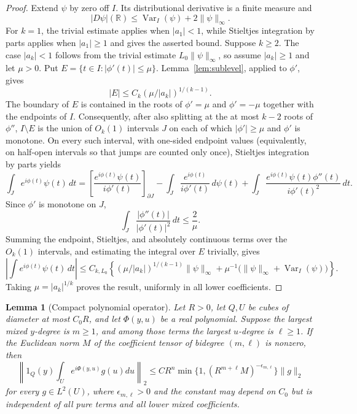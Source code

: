 \documentclass[11pt]{article}
\numberwithin{equation}{section}
\newtheorem{lemma}[theorem]{Lemma}
\theoremstyle{remark}
\theoremstyle{definition}
\newcommand{\Var}{\operatorname{Var}}
\newcommand{\norm}[1]{\lVert #1\rVert}
\begin{document}
\begin{proof}
Extend $\psi$ by zero off $I$.  Its distributional derivative is a finite
measure and
\[
 |D\psi|(\mathbb R)\le \Var_I(\psi)+2\norm\psi_\infty.
\]
For $k=1$, the trivial estimate applies when $|a_1|<1$, while Stieltjes
integration by parts applies when $|a_1|\ge1$ and gives the asserted bound.
Suppose $k\ge2$.  The case $|a_k|<1$ follows from the trivial estimate
$L_0\norm\psi_\infty$, so assume $|a_k|\ge1$ and let $\mu>0$.  Put
$E=\{t\in I:|\phi'(t)|\le\mu\}$.  Lemma~\ref{lem:sublevel}, applied to
$\phi'$, gives
\[
 |E|\le C_k(\mu/|a_k|)^{1/(k-1)}.
\]
The boundary of $E$ is contained in the roots of
$\phi'=\mu$ and $\phi'=-\mu$ together with the endpoints of $I$.
Consequently, after also splitting at the at most $k-2$ roots of $\phi''$,
$I\setminus E$ is the union of $O_k(1)$ intervals $J$ on each of which
$|\phi'|\ge\mu$ and $\phi'$ is monotone.  On every such interval, with
one-sided endpoint values (equivalently, on half-open intervals so that jumps
are counted only once), Stieltjes integration by parts yields
\[
 \int_J e^{i\phi(t)}\psi(t)\,dt
 =\left[\frac{e^{i\phi(t)}\psi(t)}{i\phi'(t)}\right]_{\partial J}
 -\int_J\frac{e^{i\phi(t)}}{i\phi'(t)}\,d\psi(t)
 +\int_J\frac{e^{i\phi(t)}\psi(t)\phi''(t)}
                  {i\phi'(t)^2}\,dt.
\]
Since $\phi'$ is monotone on $J$,
\[
 \int_J\frac{|\phi''(t)|}{|\phi'(t)|^2}\,dt\le \frac{2}{\mu}.
\]
Summing the endpoint, Stieltjes, and absolutely continuous terms over the
$O_k(1)$ intervals, and estimating the integral over $E$ trivially, gives
\[
 \left|\int e^{i\phi(t)}\psi(t)\,dt\right|
 \le C_{k,L_0}\left\{
  (\mu/|a_k|)^{1/(k-1)}\norm\psi_\infty
  +\mu^{-1}\bigl(\norm\psi_\infty+\Var_I(\psi)\bigr)
 \right\}.
\]
Taking $\mu=|a_k|^{1/k}$ proves the result, uniformly in all lower
coefficients.
\end{proof}

\begin{lemma}[Compact polynomial operator]\label{lem:compactop}
Let $R>0$, let $Q,U$ be cubes of diameter at most $C_0R$, and let
$\Phi(y,u)$ be a real
polynomial.  Suppose the largest mixed $y$-degree is $m\ge1$, and among
those terms the largest $u$-degree is $\ell\ge1$.  If the Euclidean norm
$M$ of the coefficient tensor of bidegree $(m,\ell)$ is nonzero, then
\begin{equation}\label{eq:compactop}
 \left\|1_Q(y)\int_Ue^{i\Phi(y,u)}g(u)du\right\|_2
 \le C R^n\min\{1,(R^{m+\ell}M)^{-\epsilon_{m,\ell}}\}\norm g_2
\end{equation}
for every $g\in L^2(U)$, where $\epsilon_{m,\ell}>0$ and the constant
may depend on $C_0$ but is independent of all pure
terms and all lower mixed coefficients.
\end{lemma}
\end{document}
